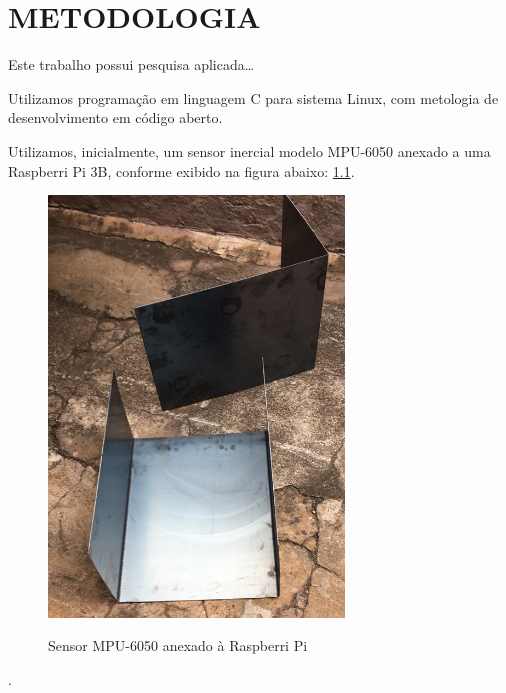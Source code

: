\chapter{METODOLOGIA}
\label{chap:metodologia}

Este trabalho possui pesquisa aplicada\ldots

Utilizamos programação em linguagem C para sistema Linux, com metologia de desenvolvimento em código aberto.

Utilizamos, inicialmente, um sensor inercial modelo MPU-6050 anexado a uma Raspberri Pi 3B, conforme exibido na figura abaixo: \ref{fig:figura22}.

\begin{figure}[H]
    \centering
    \caption{Sensor MPU-6050 anexado à Raspberri Pi}
    \includegraphics[width=0.7\textwidth]{figuras/figu22.png}
    \label{fig:figura22}
\end{figure}






























.













